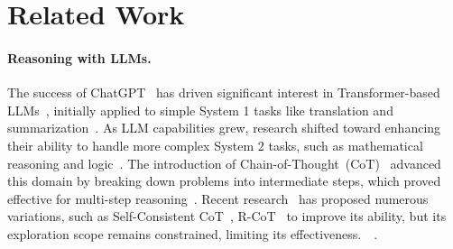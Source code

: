 \section{Related Work}
\label{app:sec:related_work}

\paragraph{Reasoning with LLMs.}
The success of ChatGPT~\cite{achiam2023gpt} has driven significant interest in Transformer-based LLMs~\cite{bai2023qwen,touvron2023llama,yang2024qwen2}, initially applied to simple System 1 tasks like translation and summarization~\cite{Brown_2020_Language,Ouyang_2022_Training}. As LLM capabilities grew, research shifted toward enhancing their ability to handle more complex System 2 tasks, such as mathematical reasoning and logic~\cite{Kojima_2022_Large,hao2023reasoning,zhang2024accessing,hosseini2024v}. The introduction of Chain-of-Thought~(CoT)~\cite{Wei_2022_Chain} advanced this domain by breaking down problems into intermediate steps, which proved effective for multi-step reasoning~\cite{Kojima_2022_Large}. Recent research~\cite{zhang2022automatic, bi2024forest} has proposed numerous variations, such as Self-Consistent CoT~\cite{wang2022self}, R-CoT~\cite{deng2024r} to improve its ability,  but its exploration scope remains constrained, limiting its effectiveness.~~\cite{chu2023survey}.

